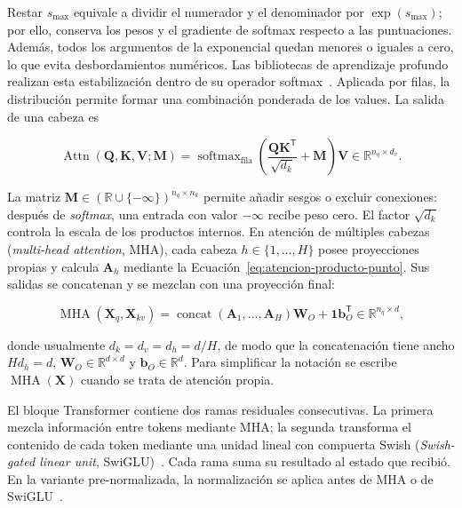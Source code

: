 Restar \(s_{\max}\) equivale a dividir el numerador y el denominador por
\(\exp(s_{\max})\); por ello, conserva los pesos y el gradiente de softmax
respecto a las puntuaciones. Además, todos los argumentos de la exponencial
quedan menores o iguales a cero, lo que evita desbordamientos numéricos. Las
bibliotecas de aprendizaje profundo realizan esta estabilización dentro de su
operador softmax~\cite{pytorch_softmax}. Aplicada por filas, la distribución
permite formar una combinación ponderada de los values. La salida de una
cabeza es

\begin{equation}
    \operatorname{Attn}(\mathbf Q,\mathbf K,\mathbf V;\mathbf M)
    =\operatorname{softmax}_{\mathrm{fila}}\!\left(
        \frac{\mathbf Q\mathbf K^{\mathsf T}}{\sqrt{d_k}}+\mathbf M
      \right)\mathbf V
    \in\mathbb R^{n_q\times d_v}.
    \label{eq:atencion-producto-punto}
\end{equation}

La matriz \(\mathbf M\in(\mathbb R\cup\{-\infty\})^{n_q\times n_k}\)
permite añadir sesgos o excluir conexiones: después de \emph{softmax}, una
entrada con valor \(-\infty\) recibe peso cero. El factor \(\sqrt{d_k}\)
controla la escala de los productos internos. En atención de múltiples cabezas
(\emph{multi-head attention}, MHA), cada cabeza \(h\in\{1,\ldots,H\}\)
posee proyecciones propias y calcula \(\mathbf A_h\) mediante la
Ecuación~\eqref{eq:atencion-producto-punto}. Sus salidas se concatenan y se
mezclan con una proyección final:

\begin{equation}
    \operatorname{MHA}(\mathbf X_q,\mathbf X_{kv})
    =\operatorname{concat}(\mathbf A_1,\ldots,\mathbf A_H)\mathbf W_O
     +\mathbf 1\mathbf b_O^{\mathsf T}
    \in\mathbb R^{n_q\times d},
    \label{eq:definicion-mha}
\end{equation}

donde usualmente \(d_k=d_v=d_h=d/H\), de modo que la concatenación tiene
ancho \(Hd_h=d\), \(\mathbf W_O\in\mathbb R^{d\times d}\) y
\(\mathbf b_O\in\mathbb R^d\). Para simplificar la notación se escribe
\(\operatorname{MHA}(\mathbf X)\) cuando se trata de atención propia.

El bloque Transformer contiene dos ramas residuales consecutivas. La primera
mezcla información entre tokens mediante MHA; la segunda transforma el contenido
de cada token mediante una unidad lineal con compuerta Swish
(\emph{Swish-gated linear unit}, SwiGLU)~\cite{shazeer_glu_2020}. Cada rama suma su resultado
al estado que recibió. En la variante pre-normalizada, la normalización se
aplica antes de MHA o de SwiGLU~\cite{xiong_layernorm_2020}.

